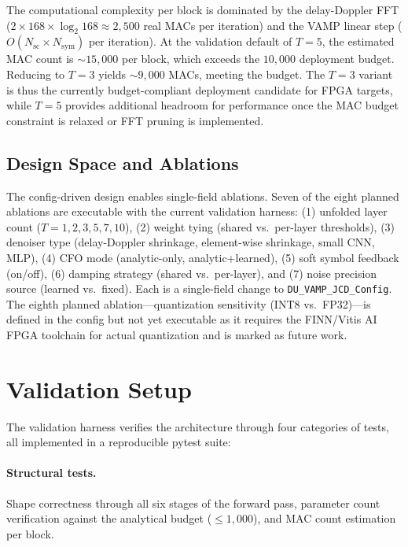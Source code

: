 \documentclass{article}
\begin{document}
The computational complexity per block is dominated by the delay-Doppler FFT ($2 \times 168 \times \log_2 168 \approx 2{,}500$ real MACs per iteration) and the VAMP linear step ($O(N_{\mathrm{sc}} \times N_{\mathrm{sym}})$ per iteration). At the validation default of $T=5$, the estimated MAC count is $\sim 15{,}000$ per block, which exceeds the $10{,}000$ deployment budget. Reducing to $T=3$ yields $\sim 9{,}000$ MACs, meeting the budget. The $T=3$ variant is thus the currently budget-compliant deployment candidate for FPGA targets, while $T=5$ provides additional headroom for performance once the MAC budget constraint is relaxed or FFT pruning is implemented. %

\subsection{Design Space and Ablations}

The config-driven design enables single-field ablations. Seven of the eight planned ablations are executable with the current validation harness: (1) unfolded layer count ($T = 1, 2, 3, 5, 7, 10$), (2) weight tying (shared vs.\ per-layer thresholds), (3) denoiser type (delay-Doppler shrinkage, element-wise shrinkage, small CNN, MLP), (4) CFO mode (analytic-only, analytic+learned), (5) soft symbol feedback (on/off), (6) damping strategy (shared vs.\ per-layer), and (7) noise precision source (learned vs.\ fixed). Each is a single-field change to \texttt{DU\_VAMP\_JCD\_Config}. The eighth planned ablation---quantization sensitivity (INT8 vs.\ FP32)---is defined in the config but not yet executable as it requires the FINN/Vitis AI FPGA toolchain for actual quantization and is marked as future work.

\section{Validation Setup}
\label{sec:validation}

The validation harness verifies the architecture through four categories of tests, all implemented in a reproducible pytest suite:

\paragraph{Structural tests.} Shape correctness through all six stages of the forward pass, parameter count verification against the analytical budget ($\leq 1{,}000$), and MAC count estimation per block.
\end{document}

